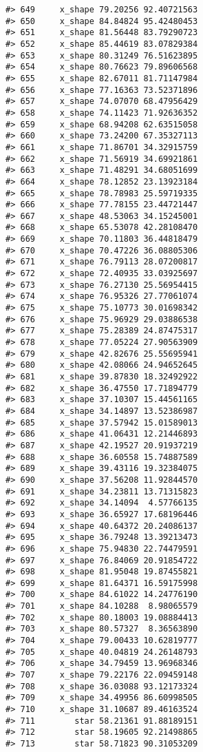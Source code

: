 \documentclass[
]{book}
\theoremstyle{definition}
\theoremstyle{definition}
\theoremstyle{definition}
\theoremstyle{definition}
\theoremstyle{remark}
\begin{document}
\begin{verbatim}
#> 649     x_shape 79.20256 92.40721563
#> 650     x_shape 84.84824 95.42480453
#> 651     x_shape 81.56448 83.79290723
#> 652     x_shape 85.44619 83.07829384
#> 653     x_shape 80.31249 76.51623895
#> 654     x_shape 80.76623 79.89606568
#> 655     x_shape 82.67011 81.71147984
#> 656     x_shape 77.16363 73.52371896
#> 657     x_shape 74.07070 68.47956429
#> 658     x_shape 74.11423 71.92636352
#> 659     x_shape 68.94208 62.63515058
#> 660     x_shape 73.24200 67.35327113
#> 661     x_shape 71.86701 34.32915759
#> 662     x_shape 71.56919 34.69921861
#> 663     x_shape 71.48291 34.68051699
#> 664     x_shape 78.12852 23.13923184
#> 665     x_shape 78.78983 25.59719335
#> 666     x_shape 77.78155 23.44721447
#> 667     x_shape 48.53063 34.15245001
#> 668     x_shape 65.53078 42.28108470
#> 669     x_shape 70.11803 36.44818479
#> 670     x_shape 70.47226 36.08805306
#> 671     x_shape 76.79113 28.07200817
#> 672     x_shape 72.40935 33.03925697
#> 673     x_shape 76.27130 25.56954415
#> 674     x_shape 76.95326 27.77061074
#> 675     x_shape 75.10773 30.01698342
#> 676     x_shape 75.96929 29.03886538
#> 677     x_shape 75.28389 24.87475317
#> 678     x_shape 77.05224 27.90563909
#> 679     x_shape 42.82676 25.55695941
#> 680     x_shape 42.08066 24.94652645
#> 681     x_shape 39.87830 18.32492922
#> 682     x_shape 36.47550 17.71894779
#> 683     x_shape 37.10307 15.44561165
#> 684     x_shape 34.14897 13.52386987
#> 685     x_shape 37.57942 15.01589013
#> 686     x_shape 41.06431 12.21446893
#> 687     x_shape 42.19527 20.91937219
#> 688     x_shape 36.60558 15.74887589
#> 689     x_shape 39.43116 19.32384075
#> 690     x_shape 37.56208 11.92844570
#> 691     x_shape 34.23811 13.71315823
#> 692     x_shape 34.14094  4.57766135
#> 693     x_shape 36.65927 17.68196446
#> 694     x_shape 40.64372 20.24086137
#> 695     x_shape 36.79248 13.39213473
#> 696     x_shape 75.94830 22.74479591
#> 697     x_shape 76.84069 20.91854722
#> 698     x_shape 81.95048 19.87455821
#> 699     x_shape 81.64371 16.59175998
#> 700     x_shape 84.61022 14.24776190
#> 701     x_shape 84.10288  8.98065579
#> 702     x_shape 80.18003 19.08884413
#> 703     x_shape 80.57327  8.36563890
#> 704     x_shape 79.00433 10.62819777
#> 705     x_shape 40.04819 24.26148793
#> 706     x_shape 34.79459 13.96968346
#> 707     x_shape 79.22176 22.09459148
#> 708     x_shape 36.03088 93.12173324
#> 709     x_shape 34.49956 86.60998505
#> 710     x_shape 31.10687 89.46163524
#> 711        star 58.21361 91.88189151
#> 712        star 58.19605 92.21498865
#> 713        star 58.71823 90.31053209

\end{verbatim}
\end{document}
